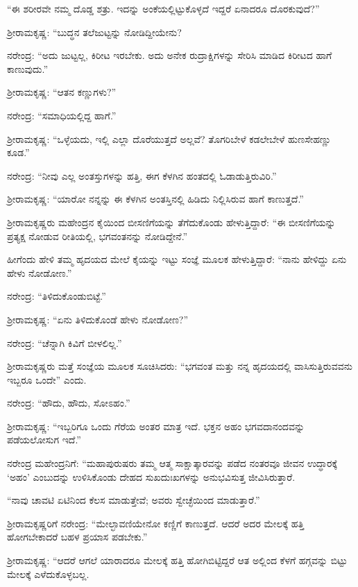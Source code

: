 “ಈ ಶರೀರವೇ ನಮ್ಮ ದೊಡ್ಡ ಶತ್ರು. ಇದನ್ನು ಅಂಕೆಯಲ್ಲಿಟ್ಟುಕೊಳ್ಳದೆ ಇದ್ದರೆ ಏನಾದರೂ ದೊರಕುವುದೆ?”

ಶ‍್ರೀರಾಮಕೃಷ್ಣ: “ಬುದ್ಧನ ತಲೆಜುಟ್ಟನ್ನು ನೋಡಿದ್ದೀಯೇನು?

ನರೇಂದ್ರ: “ಅದು ಜುಟ್ಟಲ್ಲ, ಕಿರೀಟ ಇರಬೇಕು. ಅದು ಅನೇಕ ರುದ್ರಾಕ್ಷಿಗಳನ್ನು ಸೇರಿಸಿ ಮಾಡಿದ ಕಿರೀಟದ ಹಾಗೆ ಕಾಣುವುದು.”

ಶ‍್ರೀರಾಮಕೃಷ್ಣ: “ಆತನ ಕಣ್ಣುಗಳು?”

ನರೇಂದ್ರ: “ಸಮಾಧಿಯಲ್ಲಿದ್ದ ಹಾಗೆ.”

ಶ‍್ರೀರಾಮಕೃಷ್ಣ: “ಒಳ್ಳೆಯದು, ಇಲ್ಲಿ ಎಲ್ಲಾ ದೊರೆಯುತ್ತದೆ ಅಲ್ಲವೆ? ತೊಗರಿಬೇಳೆ ಕಡಲೇಬೇಳೆ ಹುಣಸೇಹಣ್ಣು ಕೂಡ.”

ನರೇಂದ್ರ: “ನೀವು ಎಲ್ಲ ಅಂತಸ್ತುಗಳನ್ನು ಹತ್ತಿ, ಈಗ ಕೆಳಗಿನ ಹಂತದಲ್ಲಿ ಓಡಾಡುತ್ತಿರುವಿರಿ.”

ಶ‍್ರೀರಾಮಕೃಷ್ಣ: “ಯಾರೋ ನನ್ನನ್ನು ಈ ಕೆಳಗಿನ ಅಂತಸ್ತಿನಲ್ಲಿ ಹಿಡಿದು ನಿಲ್ಲಿಸಿರುವ ಹಾಗೆ ಕಾಣುತ್ತದೆ.”

ಶ‍್ರೀರಾಮಕೃಷ್ಣರು ಮಹೇಂದ್ರನ ಕೈಯಿಂದ ಬೀಸಣಿಗೆಯನ್ನು ತೆಗೆದುಕೊಂಡು ಹೇಳುತ್ತಿದ್ದಾರೆ: “ಈ ಬೀಸಣಿಗೆಯನ್ನು ಪ್ರತ್ಯಕ್ಷ ನೋಡುವ ರೀತಿಯಲ್ಲಿ, ಭಗವಂತನನ್ನು ನೋಡಿದ್ದೇನೆ.”

ಹೀಗೆಂದು ಹೇಳಿ ತಮ್ಮ ಹೃದಯದ ಮೇಲೆ ಕೈಯನ್ನು ಇಟ್ಟು ಸಂಜ್ಞೆ ಮೂಲಕ ಹೇಳುತ್ತಿದ್ದಾರೆ: “ನಾನು ಹೇಳಿದ್ದು ಏನು ಹೇಳು ನೋಡೋಣ.”

ನರೇಂದ್ರ: “ತಿಳಿದುಕೊಂಡುಬಿಟ್ಟೆ.”

ಶ‍್ರೀರಾಮಕೃಷ್ಣ: “ಏನು ತಿಳಿದುಕೊಂಡೆ ಹೇಳು ನೋಡೋಣ?”

ನರೇಂದ್ರ: “ಚೆನ್ನಾಗಿ ಕಿವಿಗೆ ಬೀಳಲಿಲ್ಲ.”

ಶ‍್ರೀರಾಮಕೃಷ್ಣರು ಮತ್ತೆ ಸಂಜ್ಞೆಯ ಮೂಲಕ ಸೂಚಿಸಿದರು: “ಭಗವಂತ ಮತ್ತು ನನ್ನ ಹೃದಯದಲ್ಲಿ ವಾಸಿಸುತ್ತಿರುವವನು ಇಬ್ಬರೂ ಒಂದೇ” ಎಂದು.

ನರೇಂದ್ರ: “ಹೌದು, ಹೌದು, ಸೋಽಹಂ.”

ಶ‍್ರೀರಾಮಕೃಷ್ಣ: “ಇಬ್ಬರಿಗೂ ಒಂದು ಗೆರೆಯ ಅಂತರ ಮಾತ್ರ ಇದೆ. ಭಕ್ತನ ಅಹಂ ಭಗವದಾನಂದವನ್ನು ಪಡೆಯಲೋಸುಗ ಇದೆ.”

\newpage

ನರೇಂದ್ರ ಮಹೇಂದ್ರನಿಗೆ: “ಮಹಾಪುರುಷರು ತಮ್ಮ ಆತ್ಮ ಸಾಕ್ಷಾತ್ಕಾರವನ್ನು ಪಡೆದ ನಂತರವೂ ಜೀವನ ಉದ್ಧಾರಕ್ಕೆ ‘ಅಹಂ’ ಎಂಬುದನ್ನು ಉಳಿಸಿಕೊಂಡು ದೇಹದ ಸುಖದುಃಖಗಳನ್ನು ಅನುಭವಿಸುತ್ತ ಜೀವಿಸಿರುತ್ತಾರೆ.

\vskip 1pt

“ನಾವು ಚಾವಟಿ ಏಟಿನಿಂದ ಕೆಲಸ ಮಾಡುತ್ತೇವೆ; ಅವರು ಸ್ವೇಚ್ಛೆಯಿಂದ ಮಾಡುತ್ತಾರೆ.”

\vskip 1pt

ಶ‍್ರೀರಾಮಕೃಷ್ಣರಿಗೆ ನರೇಂದ್ರ: “ಮೇಲ್ಛಾವಣಿಯೇನೋ ಕಣ್ಣಿಗೆ ಕಾಣುತ್ತದೆ. ಆದರೆ ಅದರ ಮೇಲಕ್ಕೆ ಹತ್ತಿ ಹೋಗಬೇಕಾದರೆ ಬಹಳ ಪ್ರಯಾಸ ಪಡಬೇಕು.”

\vskip 1pt

ಶ‍್ರೀರಾಮಕೃಷ್ಣ: “ಆದರೆ ಆಗಲೆ ಯಾರಾದರೂ ಮೇಲಕ್ಕೆ ಹತ್ತಿ ಹೋಗಿಬಿಟ್ಟಿದ್ದರೆ ಆತ ಅಲ್ಲಿಂದ ಕೆಳಗೆ ಹಗ್ಗವನ್ನು ಬಿಟ್ಟು ಮೇಲಕ್ಕೆ ಎಳೆದುಕೊಳ್ಳಬಲ್ಲ.

